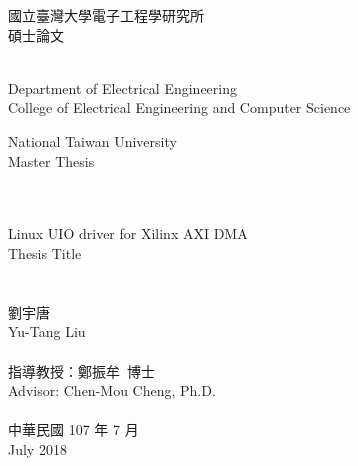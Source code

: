 \begin{titlepage}
  \begin{center}

    {\fontsize{18}{27}\selectfont
    國立臺灣大學電子工程學研究所\\
    碩士論文\\
    }

    \small{~}\\

    {\fontsize{14}{21}\selectfont
    Department of Electrical Engineering\\
    College of Electrical Engineering and Computer Science\\
    }

    {\fontsize{16}{24}\selectfont
    National Taiwan University\\
    Master Thesis\\
    }

    {\fontsize{18}{27}\selectfont
    ~\\
    ~\\

    Linux UIO driver for Xilinx AXI DMA\\
    Thesis Title\\

    ~\\
    ~\\

    劉宇唐\\
    Yu-Tang Liu\\

    ~\\

    指導教授：鄭振牟~博士\\
    Advisor: Chen-Mou Cheng, Ph.D.\\

    ~\\

    中華民國 107 年 7 月\\
    July 2018\\
    }

  \end{center}
\end{titlepage}
